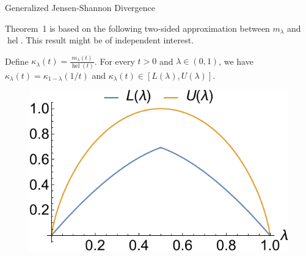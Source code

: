 \documentclass[final]{beamer}
\DeclareMathOperator{\hel}{hel}
\newcommand{\js}[2]{D_{\mathrm{JS}}( #1 \parallel #2 )}
\newcommand{\wjs}[3]{D_{\mathrm{GJS}}^{#1}( #2 \parallel #3 )}
\newlength{\threecolwid}
\begin{document}
\begin{frame}[t]
\begin{columns}[t]
\begin{column}{\threecolwid}
\begin{block}{Generalized Jensen-Shannon 
			Divergence}
		
		
		
		Theorem~1 is based on the following two-sided approximation 
		 between $ m_\lambda $ and $ \hel $. 
		This result might be of 
		independent interest.
		
			Define $ \kappa_\lambda(t) = \frac{m_\lambda(t)}{\hel(t)} $. For 
			every 
			$ 
			t>0 $ 
			and $ \lambda\in (0,1) $, we have
			$
			\kappa_\lambda(t) = \kappa_{1-\lambda}(1/t)
			$ and $
			\kappa_\lambda(t) \in [L(\lambda), U(\lambda) ]
			$.
		
		\begin{figure}
		    \centering
		    \includegraphics[width=0.5\linewidth]{figures/approximation_ratio.pdf}
		    \label{fig:approximation-ratio}
		\end{figure}
		

\end{block}
\end{column}
\end{columns}
\end{frame}
\end{document}
